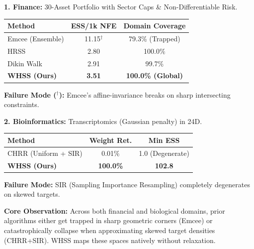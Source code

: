 \documentclass[a0paper,portrait,fleqn]{beamer}
\newcommand{\sectionheadsize}{\fontsize{40}{46}\selectfont}
\newcommand{\bodysize}{\fontsize{24}{31}\selectfont}
\renewenvironment{block}[1]{%
  \begin{tcolorbox}[breakable, enhanced, 
    colback=white, colframe=gblue,
    colbacktitle=gblue, coltitle=white,
    boxrule=2.5pt, arc=12pt, auto outer arc,
    titlerule=0pt,
    drop fuzzy shadow=black!25,
    fonttitle=\sectionheadsize\bfseries,
    title={#1}, top=18pt, bottom=18pt, left=20pt, right=20pt,
    toptitle=14pt, bottomtitle=14pt, lefttitle=18pt,
    before skip=24pt, after skip=14pt]
  \color{darktext}\bodysize
}{%
  \end{tcolorbox}
}
\begin{document}
\begin{frame}[t]
\begin{minipage}[t]{\pcolwidth}
\begin{block}{Real-World Impact: Finance \& Bioinformatics}
\textbf{\color{darktext}1. Finance:} 30-Asset Portfolio with Sector Caps \& Non-Differentiable Risk.
\begin{center}
\renewcommand{\arraystretch}{1.2}
\begin{tabular}{lcc}
\toprule
\rowcolor{gblue!15}
\textbf{Method} & \textbf{ESS/1k NFE} & \textbf{Domain Coverage} \\
\midrule
Emcee (Ensemble) & 11.15$^\dagger$ & 79.3\% (\textcolor{gred}{Trapped}) \\
HRSS      & 2.80 & 100.0\% \\
Dikin Walk & 2.91 & 99.7\% \\
\textbf{WHSS (Ours)} & \textbf{3.51} & \textbf{100.0\% (\textcolor{ggreen}{Global})} \\
\bottomrule
\end{tabular}
\end{center}
\textbf{\color{gred}Failure Mode ($^\dagger$):} Emcee's affine-invariance breaks on sharp intersecting constraints.

\vspace{16pt}
\textbf{\color{darktext}2. Bioinformatics:} Transcriptomics (Gaussian penalty) in 24D.
\begin{center}
\renewcommand{\arraystretch}{1.2}
\begin{tabular}{lcc}
\toprule
\rowcolor{gblue!15}
\textbf{Method} & \textbf{Weight Ret.} & \textbf{Min ESS} \\
\midrule
CHRR (Uniform + SIR) & 0.01\% & 1.0 (Degenerate) \\
\textbf{WHSS (Ours)} & \textbf{100.0\%} & \textbf{102.8} \\
\bottomrule
\end{tabular}
\end{center}
\textbf{\color{gred}Failure Mode:} SIR (Sampling Importance Resampling) completely degenerates on skewed targets.

\vspace{16pt}
\textbf{\color{gblue}Core Observation:} Across both financial and biological domains, prior algorithms either get trapped in sharp geometric corners (Emcee) or catastrophically collapse when approximating skewed target densities (CHRR+SIR). WHSS maps these spaces natively without relaxation.
\end{block}

\end{minipage}

\end{frame}
\end{document}
